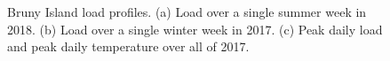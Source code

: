 \begin{figure}[htbp]
	\centering
	\vfil
	\vfil
	\caption{Bruny Island load profiles. (a) Load over a single summer week in 2018. (b) Load over a single winter week in 2017. (c) Peak daily load and peak daily temperature over all of 2017.}
	\label{fig:load-profiles}
\end{figure}

